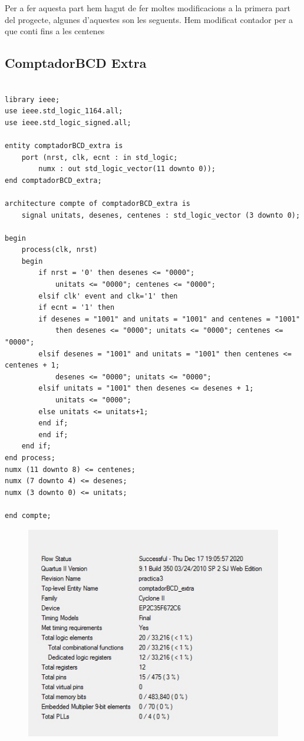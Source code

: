 \documentclass[12pt, a4papre]{article}
\begin{document}
Per a fer aquesta part hem hagut de fer moltes modificacions a la primera part del progecte, algunes d'aquestes son les seguents. Hem modificat contador per a que conti fins a les centenes

\subsection{ComptadorBCD Extra}

	\begin{lstlisting}[style=vhdl, frame=single, basicstyle=\tiny]

library ieee;
use ieee.std_logic_1164.all;
use ieee.std_logic_signed.all;

entity comptadorBCD_extra is
	port (nrst, clk, ecnt : in std_logic;
		numx : out std_logic_vector(11 downto 0));
end comptadorBCD_extra;

architecture compte of comptadorBCD_extra is 
	signal unitats, desenes, centenes : std_logic_vector (3 downto 0);
	
begin 
	process(clk, nrst)
	begin
	    if nrst = '0' then desenes <= "0000";
			unitats <= "0000"; centenes <= "0000";
	    elsif clk' event and clk='1' then
		if ecnt = '1' then
		if desenes = "1001" and unitats = "1001" and centenes = "1001" 
			then desenes <= "0000"; unitats <= "0000"; centenes <= "0000";
		elsif desenes = "1001" and unitats = "1001" then centenes <= centenes + 1;
			desenes <= "0000"; unitats <= "0000";
		elsif unitats = "1001" then desenes <= desenes + 1;
			unitats <= "0000";
		else unitats <= unitats+1;
		end if;
	    end if;
	end if;
end process;
numx (11 downto 8) <= centenes;
numx (7 downto 4) <= desenes;
numx (3 downto 0) <= unitats;

end compte;

		\end{lstlisting}
		
				\begin{figure}[H]
		\begin{center}
		\includegraphics[width=130mm]{informeComptadorBCDextra.jpeg}
		\end{center}
	\end{figure}	
		
\end{document}
